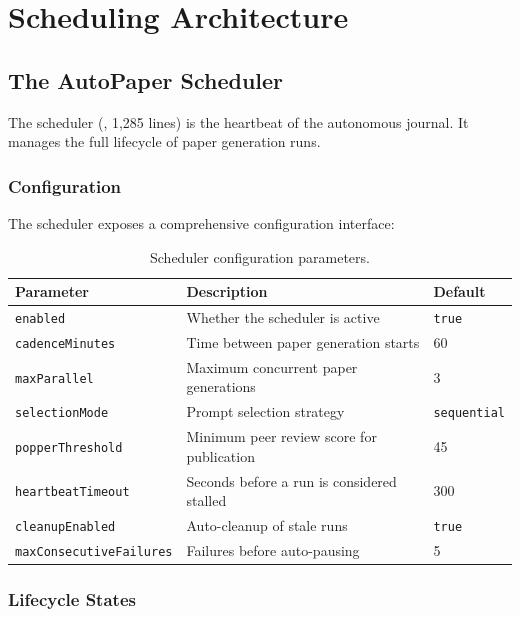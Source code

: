 \section{Scheduling Architecture}
\label{sec:journal:scheduling}

\subsection{The AutoPaper Scheduler}

The scheduler (, 1,285 lines) is the heartbeat of the autonomous journal.
It manages the full lifecycle of paper generation runs.

\subsubsection{Configuration}

The scheduler exposes a comprehensive configuration interface:

\begin{table}[H]
\centering
\caption{Scheduler configuration parameters.}
\label{tab:scheduler-config}
\begin{tabularx}{\textwidth}{lXl}
\toprule
\textbf{Parameter} & \textbf{Description} & \textbf{Default} \\
\midrule
\texttt{enabled} & Whether the scheduler is active & \texttt{true} \\
\texttt{cadenceMinutes} & Time between paper generation starts & 60 \\
\texttt{maxParallel} & Maximum concurrent paper generations & 3 \\
\texttt{selectionMode} & Prompt selection strategy & \texttt{sequential} \\
\texttt{popperThreshold} & Minimum peer review score for publication & 45 \\
\texttt{heartbeatTimeout} & Seconds before a run is considered stalled & 300 \\
\texttt{cleanupEnabled} & Auto-cleanup of stale runs & \texttt{true} \\
\texttt{maxConsecutiveFailures} & Failures before auto-pausing & 5 \\
\bottomrule
\end{tabularx}
\end{table}

\subsubsection{Lifecycle States}

